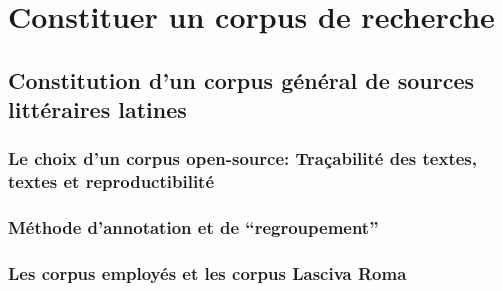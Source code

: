 


\section{Constituer un corpus de recherche}

\subsection{Constitution d’un corpus général de sources littéraires latines}

\subsubsection{Le choix d’un corpus open-source: Traçabilité des textes, textes et reproductibilité}


\subsubsection{Méthode d’annotation et de “regroupement”}


\subsubsection{Les corpus employés et les corpus Lasciva Roma}


